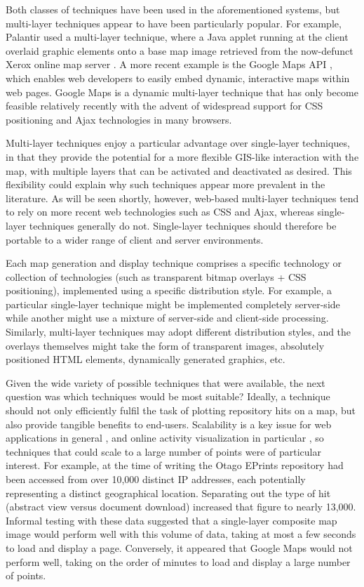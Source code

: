 \documentclass[acmnow]{acmtrans2m}
\begin{document}
Both classes of techniques have been used in the aforementioned systems,
but multi-layer techniques appear to have been particularly popular. For
example, Palantir used a multi-layer technique, where a Java applet running
at the client overlaid graphic elements onto a base map image retrieved
from the now-defunct Xerox online map server
\cite{Papa-N-1998-Palantir}. A more recent example is the Google Maps
API \cite{Goog-M-2006-maps}, which enables web developers to easily
embed dynamic, interactive maps within web pages. Google Maps is a
dynamic multi-layer technique that has only become feasible relatively
recently with the advent of widespread support for CSS positioning and
Ajax technologies in many browsers.

Multi-layer techniques enjoy a particular advantage over single-layer
techniques, in that they provide the potential for a more flexible
GIS-like interaction with the map, with multiple layers that can be
activated and deactivated as desired. This flexibility could explain why
such techniques appear more prevalent in the literature. As will be seen
shortly, however, web-based multi-layer techniques tend to rely on more
recent web technologies such as CSS and Ajax, whereas single-layer
techniques generally do not. Single-layer techniques should therefore be
portable to a wider range of client and server environments.

Each map generation and display technique comprises a specific
technology or collection of technologies (such as transparent bitmap
overlays + CSS positioning), implemented using a specific distribution
style. For example, a particular single-layer technique might be
implemented completely server-side while another might use a mixture of
server-side and client-side processing. Similarly, multi-layer
techniques may adopt different distribution styles, and the overlays
themselves might take the form of transparent images, absolutely
positioned HTML elements, dynamically generated graphics, etc.

Given the wide variety of possible techniques that were available, the
next question was which techniques would be most suitable? Ideally, a
technique should not only efficiently fulfil the task of plotting
repository hits on a map, but also provide tangible benefits to
end-users. Scalability is a key issue for web applications in general
\cite[p.\ 28]{Offu-J-2002-quality}, and online activity visualization in
particular \cite[p.\ 50]{Eick-SG-2001-sitevis}, so techniques that could
scale to a large number of points were of particular interest. For
example, at the time of writing the Otago EPrints repository had been
accessed from over 10,000 distinct IP addresses, each potentially
representing a distinct geographical location. Separating out the type
of hit (abstract view versus document download) increased that figure to
nearly 13,000. Informal testing with these data suggested that a
single-layer composite map image would perform well with this volume of
data, taking at most a few seconds to load and display a page.
Conversely, it appeared that Google Maps would not perform well, taking
on the order of minutes to load and display a large number of points.
\end{document}
